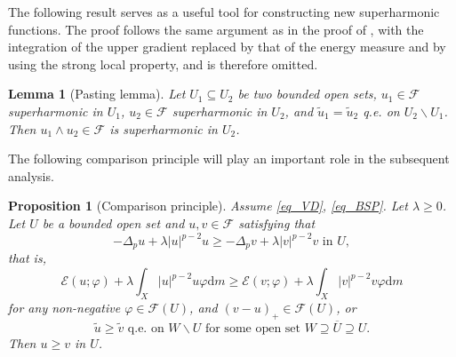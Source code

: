 \documentclass[11pt,a4paper]{article}
\numberwithin{equation}{section}
\theoremstyle{plain}
\newtheorem{proposition}[theorem]{Proposition}
\newtheorem{lemma}[theorem]{Lemma}
\theoremstyle{definition}
\begin{document}
The following result serves as a useful tool for constructing new superharmonic functions. The proof follows the same argument as in the proof of \cite[Lemma 7.13]{BB11}, with the integration of the upper gradient replaced by that of the energy measure and by using the strong local property, and is therefore omitted.

\begin{lemma}[Pasting lemma]\label{lem_pasting}
Let $U_1\subseteq U_2$ be two bounded open sets, $u_1\in\mathcal{F}$ superharmonic in $U_1$, $u_2\in\mathcal{F}$ superharmonic in $U_2$, and $\widetilde{u}_1=\widetilde{u}_2$ q.e. on $U_2\backslash U_1$. Then $u_1\wedge u_2\in\mathcal{F}$ is superharmonic in $U_2$.
\end{lemma}

The following comparison principle will play an important role in the subsequent analysis.

\begin{proposition}[Comparison principle]\label{prop_comparison}
Assume \ref{eq_VD}, \ref{eq_BSP}. Let $\lambda\ge0$. Let $U$ be a bounded open set and $u,v\in\mathcal{F}$ satisfying that
$$-\Delta_pu+\lambda|u|^{p-2}u\ge-\Delta_pv+\lambda|v|^{p-2}v\text{ in }U,$$
that is,
$$\mathcal{E}(u;\varphi)+\lambda\int_X|u|^{p-2}u\varphi\mathrm{d} m\ge\mathcal{E}(v;\varphi)+\lambda\int_X|v|^{p-2}v\varphi\mathrm{d} m$$
for any non-negative $\varphi\in\mathcal{F}(U)$, and $(v-u)_+\in \mathcal{F}(U)$, or
$$\widetilde{u}\ge \widetilde{v}\text{ q.e. on }W\backslash U\text{ for some open set }W\supseteq \overline{U}\supseteq U.$$
Then $u\ge v$ in $U$.
\end{proposition}
\end{document}
